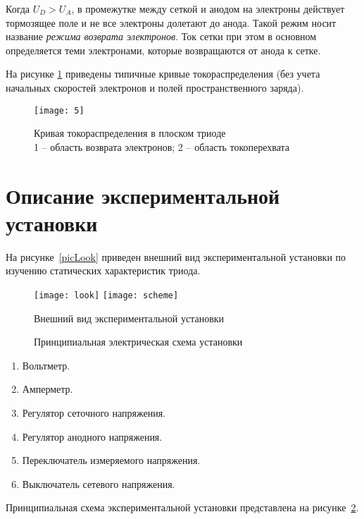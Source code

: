 Когда \( U_D > U_A \), в промежутке между сеткой и анодом на электроны
действует тормозящее поле и не все электроны долетают до анода. Такой режим
носит название \emph{режима возврата электронов}. Ток сетки при этом в основном
определяется теми электронами, которые возвращаются от анода к сетке.

На рисунке \ref{pic5} приведены типичные кривые токораспределения (без учета
начальных скоростей электронов и полей пространственного заряда).

\begin{figure}[ht]
  \center
  \texttt{[image: 5]}
  \caption{Кривая токораспределения в плоском триоде\\
  1 -- область возврата электронов; 2 -- область токоперехвата}
  \label{pic5}
\end{figure}

\section{Описание экспериментальной установки}

На рисунке~\ref{picLook} приведен внешний вид экспериментальной установки по
изучению статических характеристик триода.

\begin{figure}[ht]
  \center
  \texttt{[image: look]} \hfill
  \texttt{[image: scheme]} \\
  \parbox{.39\textwidth}{\caption{Внешний вид экспериментальной установки}
      \label{picLook}} \hfill
  \parbox{.6\textwidth}{\caption{Принципиальная электрическая схема
      установки} \label{picScheme}}
\end{figure}

\begin{enumerate}
  \item Вольтметр.
  \item Амперметр.
  \item Регулятор сеточного напряжения.
  \item Регулятор анодного напряжения.
  \item Переключатель измеряемого напряжения.
  \item Выключатель сетевого напряжения.
\end{enumerate}

Принципиальная схема экспериментальной установки представлена на
рисунке~\ref{picScheme}.

